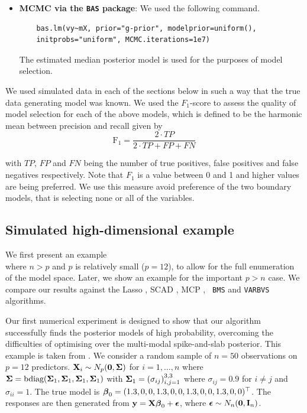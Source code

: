\begin{itemize}
	\item {\bf MCMC via the {\tt BAS} package}: We used the following command.
	\begin{verbatim}
	bas.lm(vy~mX, prior="g-prior", modelprior=uniform(), 
    initprobs="uniform", MCMC.iterations=1e7)
	\end{verbatim}
	
	\noindent 
    The estimated median posterior model is used for the purposes of model
    selection.
	
\end{itemize}

We used simulated data in each of the sections below in such a way that the
true data generating model was known. We used the $F_1$-score
\citep[see][]{Van_Rijsbergen1979} to assess the quality of model selection for
each of the above models, which is defined to be the harmonic mean between
precision and recall given by
$$
\mbox{F}_1 = \frac{2\cdot TP}{2\cdot TP + FP + FN}
$$

\noindent with $TP$, $FP$ and $FN$ being the number of true positives, false
positives and false negatives respectively. Note that $F_1$ is a value between
0 and 1 and higher values are being preferred. We use this measure avoid
preference of the two boundary models, that is selecting none or all of the
variables. 

\subsection{Simulated high-dimensional example}
\label{sec:highdimensional} 

We first present an example \\ where $n > p$ and $p$ is relatively small ($p =
12$), to allow for the full enumeration of the model space. Later, we show an
example for the important $p > n$ case. We compare our results  against the
Lasso \citep{Tibshirani1996}, SCAD \citep{Fan2001}, MCP \citep{Zhang2010}, {\tt
BMS} \citep{Zeugner2015} and {\tt VARBVS} \citep{Carbonetto2011} algorithms.

Our first numerical experiment is designed to show that our algorithm
successfully finds the posterior models of high probability, overcoming the
difficulties of optimising over the multi-modal spike-and-slab posterior.  This
example is taken from \citep{Rockova2017}.  We consider a random sample of $n =
50$ observations on $p = 12$ predictors. ${\bf X}_i \sim N_p({\bf 0}, {\boldsymbol \Sigma})$ for
$i = 1, \ldots, n$ where ${\boldsymbol \Sigma} = \text{bdiag}({\boldsymbol \Sigma}_1, {\boldsymbol \Sigma}_1,
{\boldsymbol \Sigma}_1, {\boldsymbol \Sigma}_1)$ with ${\boldsymbol \Sigma}_1 = (\sigma_{ij})_{i, j = 1}^{3, 3}$ where
$\sigma_{ij} = 0.9$ for $i \ne j$ and $\sigma_{ii} = 1$.  The true model is
${\boldsymbol \beta}_0 = (1.3, 0, 0, 1.3, 0, 0, 1.3, 0, 0, 1.3, 0, 0)^\top$.  The responses
are then generated from ${\bf y} = {\bf X} {\boldsymbol \beta}_0 + {\boldsymbol \epsilon}$, where ${\boldsymbol \epsilon} \sim
N_n({\bf 0}, {\bf I}_n)$.

